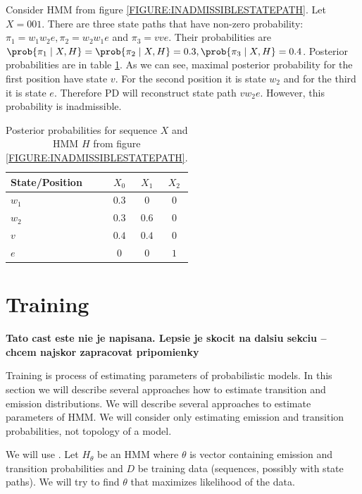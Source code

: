 \begin{example}
Consider HMM from figure \ref{FIGURE:INADMISSIBLESTATEPATH}. Let $X=001$. There
are three state paths that have non-zero probability:
$\pi_1=w_1w_2e,\pi_2=w_2w_1e$ and $\pi_3=vve$. Their probabilities are
$\prob{\pi_1\mid X,H}=\prob{\pi_2\mid X,H}=0.3, \prob{\pi_3\mid X,H}=0.4$.
Posterior probabilities are in table \ref{TABLE:INADMISSIBLESTATEPATH}.
As we can see, maximal posterior probability for the first position have state
$v$. For the second position it is state $w_2$ and for the third it is state
$e$. Therefore PD will reconstruct state path $vw_2e$. However, this probability
is inadmissible.

\begin{table}
\begin{center}
\begin{tabular}{|l|c|c|c|}
\hline
State/Position & $X_0$ & $X_1$ & $X_2$ \\\hline
$w_1$ & $0.3$ & $0$ & $0$ \\\hline
$w_2$ & $0.3$ & $0.6$ & $0$ \\\hline
$v$   & $0.4$ & $0.4$ & $0$\\\hline
$e$  & $0$ & $0$ & $1$ \\\hline
\end{tabular}
\end{center}
\caption[Example of posterior probabilities.]{Posterior probabilities for
sequence $X$ and HMM $H$ from figure \ref{FIGURE:INADMISSIBLESTATEPATH}.
}\label{TABLE:INADMISSIBLESTATEPATH}
\end{table}

\end{example}


\section{Training} 

\bigskip
{\large\bf Tato cast este nie je napisana. Lepsie je skocit na dalsiu sekciu --
chcem najskor zapracovat pripomienky}
\bigskip

Training is process of estimating parameters of probabilistic models. In this
section we will describe several approaches how to estimate transition and
emission distributions. We will describe several approaches to estimate
parameters of HMM. We will consider only estimating emission and transition
probabilities, not topology of a model.

We will use . Let $H_{\theta}$ be an HMM
where $\theta$ is vector containing emission and transition probabilities and
$D$ be training data (sequences, possibly with state paths).  We
will try to find $\theta$ that maximizes likelihood of the data.

